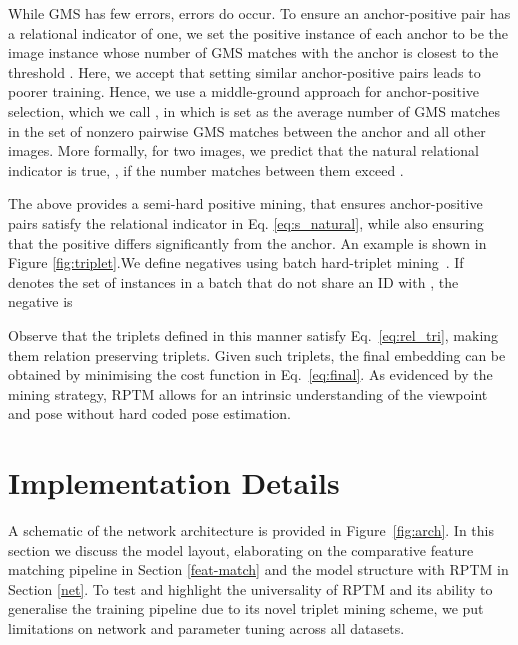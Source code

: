 \documentclass[10pt,twocolumn,letterpaper]{article}
\begin{document}
    While GMS has few errors, errors do occur. To ensure
    an anchor-positive pair has a relational indicator of one, 
    we set  the positive instance
of each anchor to be the image instance
whose number of GMS matches with the anchor is closest to the threshold . Here, we accept that setting
similar anchor-positive pairs leads to poorer training. Hence,
we use a middle-ground approach for anchor-positive selection,
which we call , in which
 is set as the average number of GMS matches in the set of nonzero pairwise GMS matches between the anchor
and all other images. More formally, 
for two images,  we predict that the natural relational indicator is true, , if the number matches between them exceed .

The above provides a semi-hard positive mining, that ensures anchor-positive pairs satisfy the relational indicator in Eq. \ref{eq:s_natural},
while also ensuring that the positive differs significantly from the anchor. An example is shown in Figure \ref{fig:triplet}.We define negatives using batch hard-triplet mining~\cite{hermans2017defense}. If 
denotes the set of instances in a batch that do not share an ID with ,
the negative is


Observe that the triplets defined in this manner satisfy Eq.~\ref{eq:rel_tri}, making them  
relation preserving triplets. Given such triplets, the final embedding can be obtained by 
minimising the cost function in Eq.~\ref{eq:final}. As evidenced by the mining strategy, RPTM allows for an intrinsic understanding
of the viewpoint and pose without hard coded pose estimation.



\section{Implementation Details}

 A schematic of the network architecture is provided in Figure~\ref{fig:arch}. In this section we discuss the model layout, elaborating on the comparative feature matching pipeline in Section \ref{feat-match} and the model structure with RPTM in Section \ref{net}. To test and highlight the universality of RPTM and its ability to generalise the training pipeline due to its novel triplet mining scheme, we put limitations on network and parameter tuning across all datasets.
 
\end{document}
